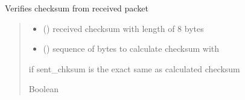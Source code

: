 \documentclass[letterpaper,10pt,oneside,english,openany]{sphinxmanual}
\begin{document}
\begin{fulllineitems}
\label{\detokenize{modules:sender_rdt.verify_integrity}}
\pysigstartsignatures
\pysiglinewithargsret
{}
{\sphinxparamcomma {}}
{}
\pysigstopsignatures
\sphinxAtStartPar
Verifies checksum from received packet
\begin{quote}\begin{description}
\begin{itemize}
\item {} 
\sphinxAtStartPar
{} () \textendash{} received checksum with length of 8 bytes

\item {} 
\sphinxAtStartPar
{} () \textendash{} sequence of bytes to calculate checksum with

\end{itemize}

\sphinxAtStartPar
if sent\_chksum is the exact same as calculated checksum

\sphinxAtStartPar
Boolean

\end{description}\end{quote}

\end{fulllineitems}




\renewcommand{\indexname}{Index}
\printindex
\end{document}
